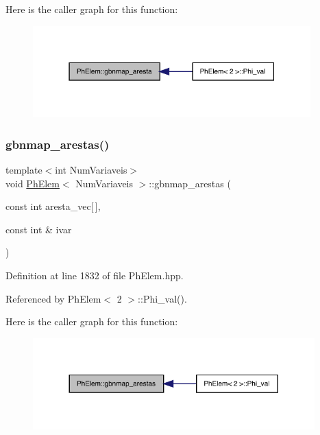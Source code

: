 Here is the caller graph for this function\+:
\nopagebreak
\begin{figure}[H]
\begin{center}
\leavevmode
\includegraphics[width=304pt]{classPhElem_a19299ae55f9faef322a1d21d7e9b2a88_icgraph}
\end{center}
\end{figure}
\mbox{\label{classPhElem_af545eccd164b2fc7ca104afff13a50c6}} 
\subsubsection{\texorpdfstring{gbnmap\+\_\+arestas()}{gbnmap\_arestas()}}
{\footnotesize\ttfamily template$<$int Num\+Variaveis$>$ \\
void \hyperlink{classPhElem}{Ph\+Elem}$<$ Num\+Variaveis $>$\+::gbnmap\+\_\+arestas (\begin{DoxyParamCaption}\item[{const int}]{aresta\+\_\+vec\mbox{[}$\,$\mbox{]},  }\item[{const int \&}]{ivar }\end{DoxyParamCaption})}



Definition at line 1832 of file Ph\+Elem.\+hpp.



Referenced by Ph\+Elem$<$ 2 $>$\+::\+Phi\+\_\+val().

Here is the caller graph for this function\+:
\nopagebreak
\begin{figure}[H]
\begin{center}
\leavevmode
\includegraphics[width=308pt]{classPhElem_af545eccd164b2fc7ca104afff13a50c6_icgraph}
\end{center}
\end{figure}
\mbox{\label{classPhElem_ad355231f4e2807541c62212647c44b3e}} 

